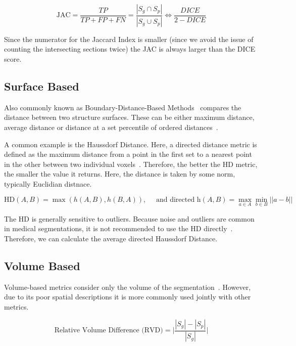 \documentclass[12pt,twoside]{report}
\begin{document}
\begin{equation*}
  \text{JAC} = \frac{TP}{TP+FP+FN} = \frac{|S_g\cap S_p|}{|S_g \cup S_p|} \iff \frac{DICE}{2 - DICE}
\end{equation*}

Since the numerator for the Jaccard Index is smaller (since we avoid the issue of counting the intersecting sections twice) the JAC is always larger than the DICE score.

\subsection{Surface Based}\label{sect:surface-based}

Also commonly known as Boundary-Distance-Based Methods~\cite{boundary-overlap-metrics} compares the distance between two structure
surfaces. These can be either maximum distance, average distance or distance at a set percentile of ordered distances~\cite{evaluation-metrics}.

A common example is the Haussdorf Distance. Here, a directed distance metric is defined as the maximum distance from a point in the first set to a nearest point in the other between two individual voxels~\cite{boundary-overlap-metrics}. Therefore, the better the HD metric, the smaller the value it returns. Here, the distance is taken by some norm, typically Euclidian distnace.

\begin{equation*}
  \text{HD}(A,B) = \max(h(A,B), h(B,A)), \quad \text{ and directed h}(A,B)=\max_{a\in A}\min_{b \in B} ||a-b||
\end{equation*}

The HD is generally sensitive to outliers. Because noise and outliers are common in medical segmentations, it is not recommended to use the HD directly~\cite{boundary-overlap-metrics}. Therefore, we can calculate the average directed Haussdorf Distance.


\subsection{Volume Based}

Volume-based metrics consider only the volume of the segmentation~\cite{evaluation-of-metrics-in-prostate,review-metrics, boundary-overlap-metrics}. However, due to its poor spatial descriptions it is more commonly used jointly with other metrics.

\begin{equation*}
  \text{Relative Volume Difference (RVD)} = \bigg| \frac{|S_g|-|S_p|}{|S_g|}\bigg|
\end{equation*}
\end{document}
